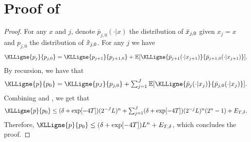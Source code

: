 \section{Proof of }
\label{sec:proof33}

\begin{proof}
  For any $x$ and $j$, denote $\bar{p}_{j,0}(\cdot|x)$ the distribution of
  $\bar{x}_{j,0}$ given $x_j = x$ and $p_{j,0}$ the distribution of
  $\tilde{x}_{j,0}$. For any $j$ we have
  \begin{equation}
    \KLLigne{p_j}{p_{j,0}} = \KLLigne{p_{j+1}}{p_{j+1,0}} + \expeLigne{\KLLigne{\bar{p}_{j+1}(\cdot|x_{j+1})}{\bar{p}_{j+1,0}(\cdot|x_{j+1}) }}  . 
  \end{equation}
  By recursion, we have that
  \begin{equation}
    \textstyle{
      \KLLigne{p}{p_{0}} = \KLLigne{p_{J}}{p_{j,0}} + \sum_{j=1}^{J} \expeLigne{\KLLigne{\bar{p}_{j}(\cdot|x_{j})}{\bar{p}_{j,0}(\cdot|x_{j}) }}  .
    }
    \end{equation}
    Combining  and ,
    we get that
  \begin{equation}
    \textstyle{
      \KLLigne{p}{p_{0}} \leq (\delta + \exp[-4T]) (2^{-J}L)^n + \sum_{j=1}^J (\delta + \exp[-4T]) (2^{-j}L)^n(2^n-1) +E_{T, \delta}  .
    }
  \end{equation}
  Therefore, $\KLLigne{p}{p_{0}} \leq (\delta + \exp[-4T]) L^n + E_{T, \delta}$, which concludes the proof.
\end{proof}

